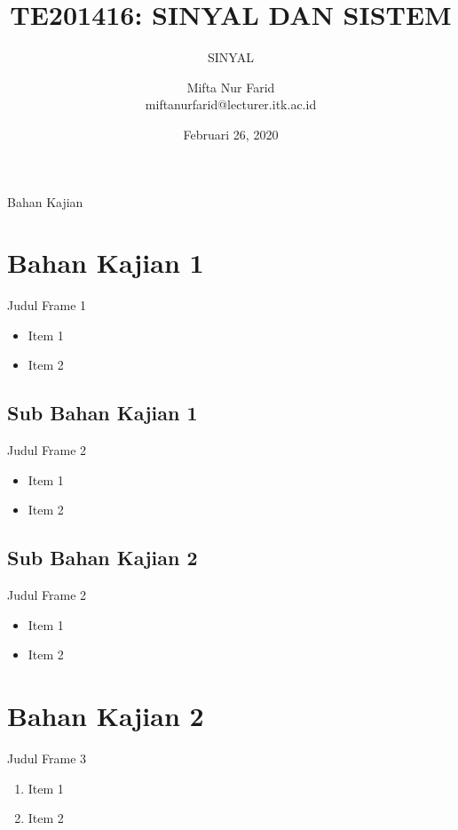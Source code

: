 \documentclass[aspectratio=169]{beamer}
\author{Mifta Nur Farid \\
	miftanurfarid@lecturer.itk.ac.id}
\title{TE201416: SINYAL DAN SISTEM}
\subtitle{SINYAL}
\institute{Teknik Elektro \\ Institut Teknologi Kalimantan \\ Balikpapan, Indonesia}
\date{\tiny Februari 26, 2020}
\begin{document}
\begin{frame}[t,plain]
\titlepage
\end{frame}

\begin{frame}{Bahan Kajian}
    \tableofcontents[subsectionstyle=hide]
\end{frame}

\section{Bahan Kajian 1}
\begin{frame}{Judul Frame 1}
	\begin{itemize}
		\item Item 1
		\item Item 2
	\end{itemize}
\end{frame}

\subsection{Sub Bahan Kajian 1}
\begin{frame}{Judul Frame 2}
	\begin{itemize}
		\item Item 1
		\item Item 2
	\end{itemize}
\end{frame}

\subsection{Sub Bahan Kajian 2}
\begin{frame}{Judul Frame 2}
	\begin{itemize}
		\item Item 1
		\item Item 2
	\end{itemize}
\end{frame}

\section{Bahan Kajian 2}
\begin{frame}{Judul Frame 3}
	\begin{enumerate}
		\item Item 1
		\item Item 2
	\end{enumerate}
\end{frame}
\end{document}
